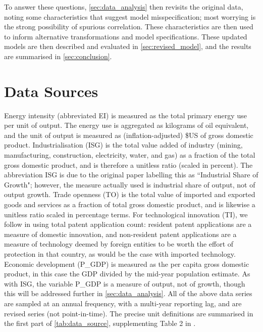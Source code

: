 \documentclass[11pt,a4paper]{article}
\begin{document}
To answer these questions, \cref{sec:data_analysis} then revisits the original data, noting some characteristics that suggest model misspecification; most worrying is the strong possibility of spurious correlation.
These characteristics are then used to inform alternative transformations and model specifications.
These updated models are then described and evaluated in \cref{sec:revised_model}, and the results are summarised in \cref{sec:conclusion}.

\clearpage

\section{Data Sources}\label{sec:data_sources}
Energy intensity (abbreviated EI) is measured as the total primary energy use per unit of output. 
The energy use is aggregated as kilograms of oil equivalent, and the unit of output is measured as (inflation-adjusted) \$US of gross domestic product.
Industrialisation (ISG) is the total value added of industry (mining, manufacturing, construction, electricity, water, and gas) as a fraction of the total gross domestic product, and is therefore a unitless ratio (scaled in percent).
The abbreviation ISG is due to the original paper labelling this as ``Industrial Share of Growth"; however, the measure actually used is industrial share of output, not of output growth.
Trade openness (TO) is the total value of imported and exported goods and services as a fraction of total gross domestic product, and is likewise a unitless ratio scaled in percentage terms.
For technological innovation (TI), we follow \cite{panHowIndustrializationTrade2019} in using total patent application count: resident patent applications are a measure of domestic innovation, and non-resident patent applications are a measure of technology deemed by foreign entities to be worth the effort of protection in that country, as would be the case with imported technology.
Economic development (P\_GDP) is measured as the per capita gross domestic product, in this case the GDP divided by the mid-year population estimate. 
As with ISG, the variable P\_GDP is a measure of output, not of growth, though this will be addressed further in \cref{sec:data_analysis}. 
All of the above data series are sampled at an annual frequency, with a multi-year reporting lag, and are revised series (not point-in-time).
The precise unit definitions are summarised in the first part of \cref{tab:data_source}, supplementing Table 2 in \cite{panHowIndustrializationTrade2019}.
\end{document}
